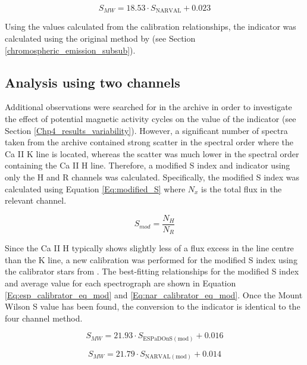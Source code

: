 \begin{equation}
S_{MW} = 18.53 \cdot S_{\mathrm{NARVAL}} + 0.023
\label{Eq:nar_calibrator_eq}
\end{equation} 

Using the \Smw values calculated from the calibration relationships, the \Rprime indicator was calculated using the original method by \citet{Noyes_etal_1984} (see Section \ref{chromospheric_emission_subsub}).

\subsection{Analysis using two channels}
\label{Chp4_data_analysis_two_channel}
Additional observations were searched for in the \esp archive in order to investigate the effect of potential magnetic activity cycles on the value of the \Rprime indicator (see Section \ref{Chp4_results_variability}). However, a significant number of spectra taken from the \esp archive contained strong scatter in the spectral order where the Ca II K line is located, whereas the scatter was much lower in the spectral order containing the Ca II H line. Therefore, a modified S index and \Rprime indicator using only the H and R channels was calculated. Specifically, the modified S index was calculated using Equation \ref{Eq:modified_S} where $N_{x}$ is the total flux in the relevant channel.

\begin{equation}
    S_{mod} = \frac{N_{H}}{N_{R}}
    \label{Eq:modified_S}
\end{equation}

Since the Ca II H typically shows slightly less of a flux excess in the line centre than the K line, a new \Smw calibration was performed for the modified S index using the calibrator stars from \citet{Duncan_etal_1991}. The best-fitting relationships for the modified S index and average \Smw value for each spectrograph are shown in Equation \ref{Eq:esp_calibrator_eq_mod} and \ref{Eq:nar_calibrator_eq_mod}. Once the Mount Wilson S value has been found, the conversion to the \Rprime indicator is identical to the four channel method.

\begin{equation}
S_{MW} = 21.93 \cdot S_{\mathrm{ESPaDOnS (mod)}}+ 0.016
\label{Eq:esp_calibrator_eq_mod}
\end{equation}

\begin{equation}
S_{MW} = 21.79 \cdot S_{\mathrm{NARVAL (mod)}} + 0.014
\label{Eq:nar_calibrator_eq_mod}
\end{equation} 

